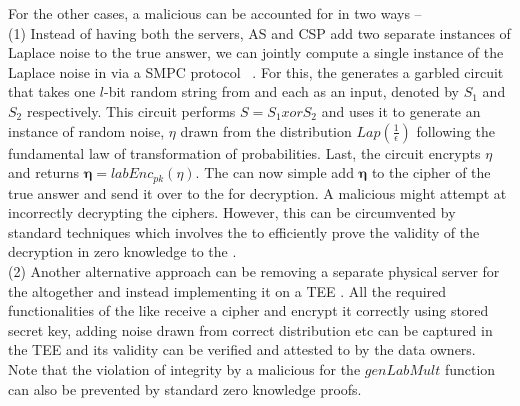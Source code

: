 For the other cases, a malicious \CSP can be accounted for in two ways --\\
(1)  Instead of having  both the servers, \textsf{AS} and \textsf{CSP} add two separate instances of Laplace noise to the true answer, we can jointly compute a single instance of the Laplace noise in \system via a SMPC protocol ~\cite{Djoin,DworkOurData}. For this, the \CPS generates a garbled circuit that takes one $l$-bit random string from \CPS and \AS each as an input, denoted by $S_1$ and $S_2$ respectively. This circuit performs $S=S_1 xor S_2$  and uses it to generate an instance of random noise, $\eta$ drawn from the distribution $Lap(\frac{1}{\epsilon})$ following the fundamental law of transformation of probabilities.
Last, the circuit encrypts $\eta$ and returns $\boldsymbol{\eta}=labEnc_{pk}(\eta)$. 
The \AS can now simple add $\boldsymbol{\eta}$ to the cipher of the true answer and send it over to the \CSP for decryption. A malicious \CSP might attempt at incorrectly decrypting the ciphers. However, this can be circumvented by standard techniques which involves the \CSP to efficiently prove the validity of the decryption in zero knowledge to the \AS.\\
(2)  Another alternative approach can be removing a separate physical server for the \CSP altogether and instead implementing it on a TEE \cite{Boneh2,Prochlo,Aïmeur2008}. All the required functionalities of the \CSP like receive a cipher and encrypt it correctly using stored secret key, adding noise drawn from correct distribution etc can be captured in the TEE and its validity can be verified and attested to by the data owners.
\\Note that the violation of integrity by a malicious \CSP for the $genLabMult$ function can also be prevented by standard zero knowledge proofs.

